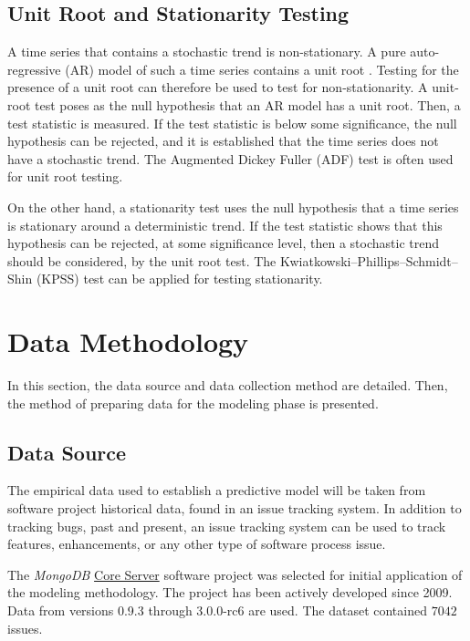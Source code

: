 \documentclass[letterpaper]{report}
\begin{document}
\section*{Unit Root and Stationarity Testing}
A time series that contains a stochastic trend is non-stationary. A pure auto-regressive (AR) model of such a time series contains a unit root \cite{franses1998time}. Testing for the presence of a unit root can therefore be used to test for non-stationarity. A unit-root test poses as the null hypothesis that an AR model has a unit root. Then, a test statistic is measured. If the test statistic is below some significance, the null hypothesis can be rejected, and it is established that the time series does not have a stochastic trend. The Augmented Dickey Fuller (ADF) test is often used for unit root testing.

On the other hand, a stationarity test uses the null hypothesis that a time series is stationary around a deterministic trend. If the test statistic shows that this hypothesis can be rejected, at some significance level, then a stochastic trend should be considered, by the unit root test. The Kwiatkowski–Phillips–Schmidt–Shin (KPSS) test can be applied for testing stationarity.

\chapter{Data Methodology}
\label{sec:data_methodology}

In this section, the data source and data collection method are detailed. Then, the method of preparing data for the modeling phase is presented.

\section*{Data Source}
The empirical data used to establish a predictive model will be taken from software project historical data, found in an issue tracking system. In addition to tracking bugs, past and present, an issue tracking system can be used to track features, enhancements, or any other type of software process issue. 

The \textit{MongoDB} \href{https://jira.mongodb.org/browse/SERVER}{Core Server} software project was selected for initial application of the modeling methodology. The project has been actively developed since 2009. Data from versions 0.9.3 through 3.0.0-rc6 are used. The dataset contained $7042$ issues.
\end{document}
